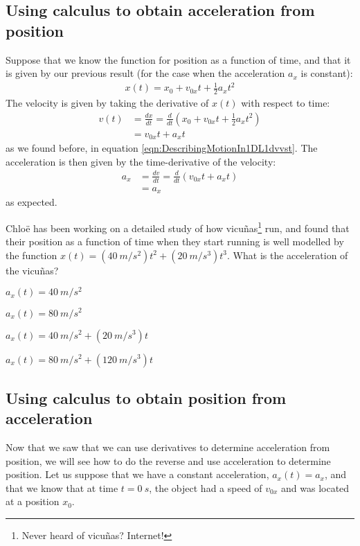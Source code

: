 \subsection{Using calculus to obtain acceleration from position}
Suppose that we know the function for position as a function of time, and that it is given by our previous result (for the case when the acceleration $a_x$ is constant):
\begin{align*}
x(t)=x_0+v_{0x}t+\frac{1}{2}a_xt^2
\end{align*}
The velocity is given by taking the derivative of $x(t)$ with respect to time:
\begin{align*}
v(t)&=\frac{dx}{dt}=\frac{d}{dt}\left(x_0+v_{0x}t+\frac{1}{2}a_xt^2\right)\\
&=v_{0x}t+a_xt
\end{align*}
as we found before, in equation \ref{eqn:DescribingMotionIn1DL1dvvst}. The acceleration is then given by the time-derivative of the velocity:
\begin{align*}
a_x &= \frac{dv}{dt}=\frac{d}{dt}\left(v_{0x}t+a_xt\right)\\
&=a_x
\end{align*}
as expected.


\begin{checkpoint}
\begin{MCquestion}{Chlo\"e has been working on a detailed study of how vicu\~nas\footnote{Never heard of vicu\~nas? Internet!} run, and found that their position as a function of time when they start running is well modelled by the function $x(t)=(\SI{40}{m/s^2})t^2+(\SI{20}{m/s^3})t^3$. What is the acceleration of the vicu\~nas?}
\item $a_x(t)=\SI{40}{m/s^2}$
\item $a_x(t)=\SI{80}{m/s^2}$
\item $a_x(t)=\SI{40}{m/s^2}+(\SI{20}{m/s^3})t$
\item $a_x(t)=\SI{80}{m/s^2}+(\SI{120}{m/s^3})t$ %
\end{MCquestion}
\end{checkpoint}

\subsection{Using calculus to obtain position from acceleration}
Now that we saw that we can use derivatives to determine acceleration from position, we will see how to do the reverse and use acceleration to determine position. Let us suppose that we have a constant acceleration, $a_x(t)=a_x$, and that we know that at time $t=\SI{0}{s}$, the object had a speed of $v_{0x}$ and was located at a position $x_0$. 

